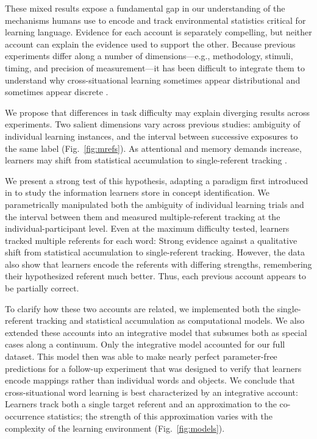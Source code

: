 \documentclass{pnastwo}
\begin{document}
\begin{article}
These mixed results expose a fundamental gap in our understanding of the mechanisms humans use to encode and track environmental statistics critical for learning language. Evidence for each account is separately compelling, but neither account can explain the evidence used to support the other. Because previous experiments differ along a number of dimensions---e.g., methodology, stimuli, timing, and precision of measurement---it has been difficult to integrate them to understand why cross-situational learning sometimes appear distributional and sometimes appear discrete \citep[for review, see][]{Yurovsky2014}. 

We propose that differences in task difficulty may explain diverging results across experiments. Two salient dimensions vary across previous studies: ambiguity of individual learning instances, and the interval between successive exposures to the same label (Fig.~\ref{fig:mrefs}). As attentional and memory demands increase, learners may shift from statistical accumulation to single-referent tracking \citep{Smith2011a, Trueswell2013}. 

We present a strong test of this hypothesis, adapting a paradigm first introduced in \citep{Bower1963} to study the information learners store in concept identification. We parametrically manipulated both the ambiguity of individual learning trials and the interval between them and measured multiple-referent tracking at the individual-participant level. Even at the maximum difficulty tested, learners tracked multiple referents for each word: Strong evidence against a qualitative shift from statistical accumulation to single-referent tracking. However, the data also show that learners encode the referents with differing strengths, remembering their hypothesized referent much better. Thus, each previous account appears to be partially correct. 

To clarify how these two accounts are related, we implemented both the single-referent tracking and statistical accumulation as computational models. We also extended these accounts into an integrative model that subsumes both as special cases along a continuum. Only the integrative model accounted for our full dataset. This model then was able to make nearly perfect parameter-free predictions for a follow-up experiment that was designed to verify that learners encode mappings rather than individual words and objects. We conclude that cross-situational word learning is best characterized by an integrative account: Learners track both a single target referent and an approximation to the co-occurrence statistics; the strength of this approximation varies with the complexity of the learning environment (Fig.~\ref{fig:models}).


\end{article}
\end{document}
